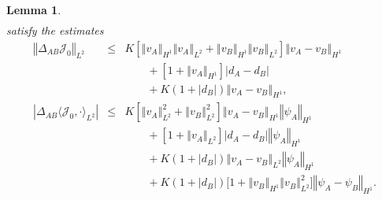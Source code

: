 \documentclass[10pt]{articleHJ}
\newcommand{\abs}[1]{\left\vert#1\right\vert}			%
\newcommand{\norm}[1]{\left\Vert#1\right\Vert}		%
\newtheorem{lem}[thm]{Lemma}
\numberwithin{equation}{section}
\begin{document}
\begin{lem}
\begin{equation}
\begin{array}{lcl}
\end{array}
\end{equation}
satisfy the estimates
\begin{equation}
\label{eq:prlm:j0:lip:bnds}
\begin{array}{lcl}
\norm{\Delta_{AB} \mathcal{J}_0 }_{L^2}
  & \le &
  K [\norm{v_A}_{H^1} \norm{v_A}_{L^2}
    + \norm{v_B}_{H^1} \norm{v_B}_{L^2} ] \norm{v_A-v_B}_{H^1}
\\[0.2cm]
& & \qquad  + [1 + \norm{v_A}_{H^1} ]
  \abs{d_A - d_B }
\\[0.2cm]
& & \qquad
  + K( 1 + \abs{d_B} ) \norm{v_A-v_B}_{H^1} ,
\\[0.2cm]
%
\abs{ \Delta_{AB} \langle \mathcal{J}_0, \cdot \rangle_{L^2} }
 & \le &
 K [\norm{v_A}_{L^2}^2 +  \norm{v_B}_{L^2}^2 ] \norm{v_A-v_B}_{H^1}
   \norm{\psi_A}_{H^1}
\\[0.2cm]
& & \qquad  + [1 + \norm{v_A}_{L^2} ] \abs{d_A - d_B }
   \norm{\psi_A}_{H^1}
\\[0.2cm]
& & \qquad
  + K( 1 + \abs{d_B} ) \norm{v_A-v_B}_{L^2} \norm{\psi_A}_{H^1}
\\[0.2cm]
& & \qquad
  + K (1 + \abs{d_B})
  \big[1
     + \norm{v_B}_{H^1} \norm{v_B}_{L^2}^2 \big]
  \norm{\psi_A - \psi_B}_{H^1} .
\end{array}
\end{equation}
\end{lem}
\end{document}
